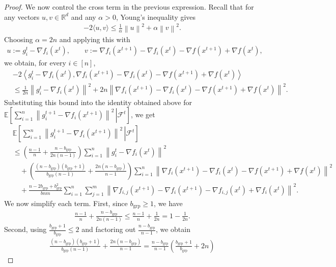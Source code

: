 \documentclass{article}
\newcommand{\bb}{\mathbb}
\newcommand{\R}{\bb R}
\newcommand{\sqn}[1]{\left\| #1 \right\|^2}
\newcommand{\eqdef}{:=}
\newcommand{\Expb}[2]{\mathbb{E}\!\left[\left. #1\,\right|#2 \right]}
\newcommand{\Expc}[1]{\Expb{#1}{\mathcal{F}^t}}
\theoremstyle{plain}
\begin{document}
\begin{proof}
We now control the cross term in the previous expression. Recall that for any vectors $u,v\in\R^d$ and any $\alpha>0$,
Young's inequality gives
\begin{align*}
-2\langle u,v\rangle \leq \frac{1}{\alpha}\sqn{u}+\alpha \sqn{v}.
\end{align*}
Choosing $\alpha=2n$ and applying this with
\begin{align*}
u \eqdef g_i^{t}-\nabla f_i(x^{t}),
\qquad
v \eqdef \nabla f_{i}(x^{t+1})-\nabla f_{i}(x^{t})-\nabla f(x^{t+1})+\nabla f(x^{t}),
\end{align*}
we obtain, for every $i\in[n]$,
\begin{align*}
&-2\left\langle g_i^{t}-\nabla f_i(x^{t}),\nabla f_{i}(x^{t+1})-\nabla f_{i}(x^{t})-\nabla f(x^{t+1})+\nabla f(x^{t})\right\rangle\\
&\leq \frac{1}{2n}\sqn{g_i^{t}-\nabla f_i(x^{t})}
+2n\sqn{\nabla f_{i}(x^{t+1})-\nabla f_{i}(x^{t})-\nabla f(x^{t+1})+\nabla f(x^{t})}.
\end{align*}
Substituting this bound into the identity obtained above for
$\Expc{\sum_{i=1}^n \sqn{g_i^{t+1}-\nabla f_i(x^{t+1})}}$, we get
\begin{align*}
&\Expc{\sum_{i=1}^n \sqn{g_i^{t+1}-\nabla f_i(x^{t+1})}}\\
&\leq \left(\frac{n-1}{n} +\frac{n-b_{\mathrm{grp}}}{2n(n-1)}\right)\sum_{i=1}^n\sqn{g_i^t - \nabla f_i(x^{t})}\\
&\quad+\left(\frac{(n-b_{\mathrm{grp}})(b_{\mathrm{grp}}+1)}{b_{\mathrm{grp}}(n-1)}+\frac{2n(n-b_{\mathrm{grp}})}{n-1}\right)
\sum_{i=1}^n\sqn{\nabla f_{i}(x^{t+1})-\nabla f_{i}(x^{t}) -\nabla f(x^{t+1})+\nabla f(x^{t})}\\
&\quad+\frac{n-2b_{\mathrm{grp}}+b_{\mathrm{grp}}^2}{bnm}\sum_{i=1}^n\sum_{j=1}^m
\sqn{\nabla f_{i,j}(x^{t+1})- \nabla f_{i}(x^{t+1})-\nabla f_{i,j}(x^{t})+\nabla f_{i}(x^{t})}.
\end{align*}
We now simplify each term. First, since $b_{\mathrm{grp}}\geq 1$, we have
\begin{align*}
\frac{n-1}{n} +\frac{n-b_{\mathrm{grp}}}{2n(n-1)} \leq \frac{n-1}{n}+\frac{1}{2n}=1-\frac{1}{2n}.
\end{align*}
Second, using $\frac{b_{\mathrm{grp}}+1}{b_{\mathrm{grp}}}\leq 2$ and factoring out $\frac{n-b_{\mathrm{grp}}}{n-1}$, we obtain
\begin{align*}
\frac{(n-b_{\mathrm{grp}})(b_{\mathrm{grp}}+1)}{b_{\mathrm{grp}}(n-1)}+\frac{2n(n-b_{\mathrm{grp}})}{n-1}
=\frac{n-b_{\mathrm{grp}}}{n-1}\left(\frac{b_{\mathrm{grp}}+1}{b_{\mathrm{grp}}}+2n\right)

\end{align*}
\end{proof}
\end{document}
